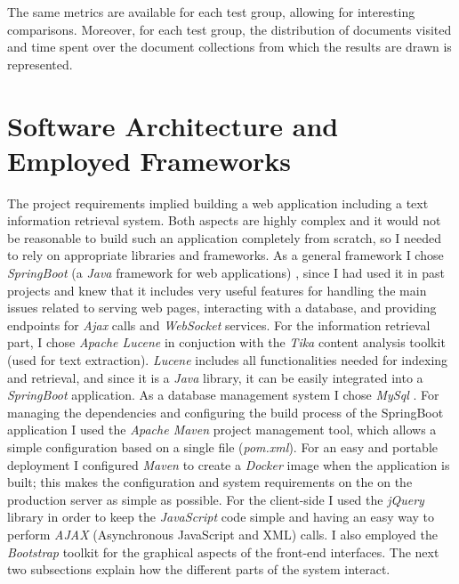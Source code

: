 \documentclass[a4paper]{usiinfbachelorproject}
\begin{document}
The same metrics are available for each test group, allowing for interesting comparisons. Moreover, for each test group, the distribution
of documents visited and time spent over the document collections from which the results are drawn is represented.


\newpage

\section{\textbf{Software Architecture and Employed Frameworks}} \label{sec:arch}

The project requirements implied building a web application including a text information retrieval system. Both aspects are highly complex and it would not be reasonable to build such an application completely from scratch, so I
needed to rely on appropriate libraries and frameworks. As a general framework I chose \emph{SpringBoot} 
(a \emph{Java} framework for web applications) \cite{springBootHome}, since
I had used it in past projects and knew that it includes very useful features for handling the main issues related to
serving web pages, interacting with a database, and providing endpoints for \emph{Ajax} calls and \emph{WebSocket} services.
For the information retrieval part, I chose \emph{Apache Lucene} \cite{luceneHome} in conjuction with the \emph{Tika} content analysis toolkit \cite{tikaHome}
(used for text extraction). \emph{Lucene} includes all functionalities needed for indexing and retrieval,
and since it is a \emph{Java} library, it can be easily integrated into a \emph{SpringBoot} application. As a database management system
I chose \emph{MySql} \cite{MySQLhome}.
For managing the dependencies and configuring the build process of the SpringBoot application I used the \emph{Apache Maven}
project management tool, which allows a simple configuration based on a single file (\emph{pom.xml}).
For an easy and portable deployment I configured \emph{Maven} to create a \emph{Docker} \cite{dockerHome} image when the application is built;
this makes the configuration and system requirements on the on the production server as simple as possible.  
For the client-side I used the \emph{jQuery}\cite{jQueryHome} library in order to keep the \emph{JavaScript} code simple
and having an easy way to perform \emph{AJAX} (Asynchronous JavaScript and XML) calls. I also employed the
\emph{Bootstrap} \cite{bootstrapHome} toolkit for the graphical aspects of the front-end interfaces.
The next two subsections explain how the different parts of the system interact.
\end{document}
